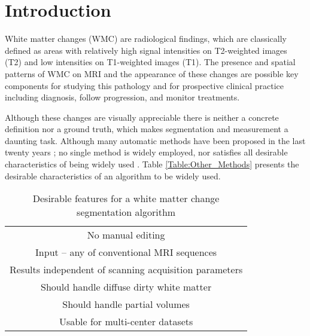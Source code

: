 \section{Introduction} \label{intro}


White matter changes (WMC) are radiological findings, which are classically defined as areas with relatively high signal intensities on T2-weighted images (T2) and low intensities on T1-weighted images (T1). The presence and spatial patterns of WMC on MRI and the appearance of these changes are possible key components for studying this pathology and for prospective clinical practice including diagnosis, follow progression, and monitor treatments.

Although these changes are visually appreciable there is neither a concrete definition nor a ground truth, which makes segmentation and measurement a daunting task. Although many automatic methods have been proposed in the last twenty years \cite{Kamber_1995,Udupa_1997,Boudraa2000,Zijdenbos_2002,LesionTOADS_2010,OutlierLocalIntensity_2011,CascadeOrig,LesionSegmentationToolbox_2012,kNN-TTPs_2013,Rotation-invariant_2015}; no single method is widely employed, nor satisfies all desirable characteristics of being widely used \cite{GarciaReview}. Table \ref{Table:Other_Methods} presents the desirable characteristics of an algorithm to be widely used.



\begin{table}
\centering
    \begin{tabular}  {  c }
    \hline
        No manual editing \\ 
        Input – any of conventional MRI sequences \\ 
        Results independent of scanning acquisition parameters \\ 
        Should handle diffuse dirty white matter \\ 
        Should handle partial volumes \\ 
        Usable for multi-center datasets \\
    \hline
    \end{tabular} 
    \caption{Desirable features for a white matter change segmentation algorithm } 
    \label{Table:Requirements}
\end{table}
    
